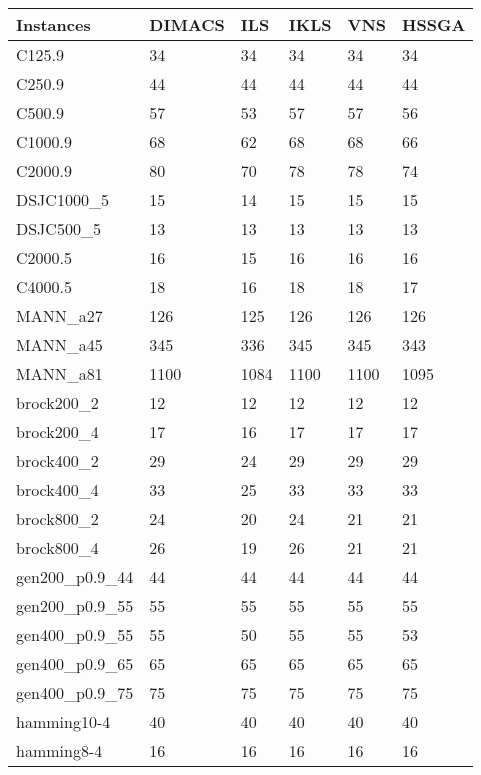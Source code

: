 \documentclass{article}
\begin{document}
\begin{center}
\begin{table}
\begin{tabular}{| l | l | l | l | l | l |}
    \hline
    Instances			& 	DIMACS		& ILS		& IKLS\cite{kopt}	&VNS\cite{vns}	& HSSGA\cite{HSSGA}\\ \hline
C125.9				&	34			&34			&34				&34				&34\\ \hline
C250.9				&	44			&44			&44				&44				&44\\ \hline
C500.9				&	57			&53			&57				&57				&56\\ \hline
C1000.9				&	68			&62			&68				&68				&66\\ \hline
C2000.9 			&	80			&70			&78				&78				&74\\ \hline	
DSJC1000\_5		&	15			&14			&15				&15				&15\\ \hline
DSJC500\_5			&	13			&13			&13				&13				&13\\ \hline
C2000.5				&	16			&15			&16				&16				&16\\ \hline
C4000.5 			&	18			&16			&18				&18				&17\\ \hline
MANN\_a27			&	126			&125		&126			&126			&126\\ \hline
MANN\_a45			&	345			&336		&345			&345			&343\\ \hline
MANN\_a81			&	1100		&1084		&1100			&1100			&1095\\ \hline
brock200\_2			&	12			&12			&12				&12				&12\\ \hline
brock200\_4			&	17			&16			&17				&17				&17\\ \hline
brock400\_2			&	29			&24			&29				&29				&29\\ \hline
brock400\_4			&	33			&25			&33				&33				&33\\ \hline
brock800\_2			&	24			&20			&24				&21				&21\\ \hline
brock800\_4			&	26			&19			&26				&21				&21\\ \hline
gen200\_p0.9\_44	&	44			&44			&44				&44				&44\\ \hline
gen200\_p0.9\_55	&	55			&55			&55				&55				&55\\ \hline
gen400\_p0.9\_55	&	55			&50			&55				&55				&53\\ \hline
gen400\_p0.9\_65	&	65			&65			&65				&65				&65\\ \hline
gen400\_p0.9\_75	&	75			&75			&75				&75				&75\\ \hline
hamming10-4		&	40			&40			&40				&40				&40\\ \hline
hamming8-4			&	16			&16			&16				&16				&16\\ \hline

\end{tabular}
\end{table}
\end{center}
\end{document}
